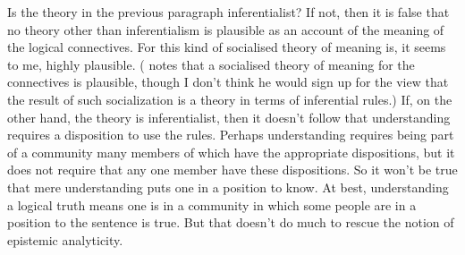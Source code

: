 Is the theory in the previous paragraph inferentialist? If not, then it is false that no theory other than inferentialism is plausible as an account of the meaning of the logical connectives. For this kind of socialised theory of meaning is, it seems to me, highly plausible. (\citet{Williamson2011-WILRTB-3} notes that a socialised theory of meaning for the connectives is plausible, though I don't think he would sign up for the view that the result of such socialization is a theory in terms of inferential rules.) If, on the other hand, the theory is inferentialist, then it doesn't follow that understanding requires a disposition to use the rules. Perhaps understanding requires being part of a community many members of which have the appropriate dispositions, but it does not require that any one member have these dispositions. So it won't be true that mere understanding puts one in a position to know. At best, understanding a logical truth means one is in a community in which some people are in a position to the sentence is true. But that doesn't do much to rescue the notion of epistemic analyticity.
